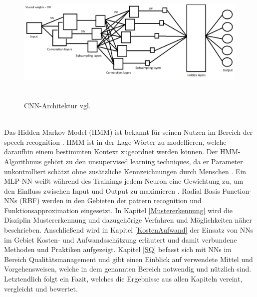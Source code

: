 \\
\vspace{6.0cm}
\begin{figure}[h]
\includegraphics[width=\linewidth, height=6cm]{Bilder/CNN/CNNArchitektur.png}
\caption{CNN-Architektur vgl. \cite{noisycnn}}
\end{figure}
\\
Das Hidden Markov Model (HMM) ist bekannt für seinen Nutzen im Bereich der speech recognition \cite{residualnn}. HMM ist in der Lage Wörter zu modellieren, welche daraufhin einem bestimmten Kontext zugeordnet werden können. Der HMM-Algorithmus gehört zu den unsupervised learning techniques, da er Parameter unkontrolliert schätzt ohne zusätzliche Kennzeichnungen durch Menschen \cite{hmm}. Ein MLP-NN weißt während des Trainings jedem Neuron eine Gewichtung zu, um den Einfluss zwischen Input und Output zu maximieren \cite{Khalifelu2012}. Radial Basis Function-NNs (RBF) werden in den Gebieten der pattern recognition und Funktionsapproximation eingesetzt. In Kapitel \ref{Mustererkennung} wird die Disziplin Mustererkennung und dazugehörige Verfahren und Möglichkeiten näher beschrieben. Anschließend wird in Kapitel \ref{KostenAufwand} der Einsatz von NNs im Gebiet Kosten- und Aufwandsschätzung erläutert und damit verbundene Methoden und Praktiken aufgezeigt. Kapitel \ref{SQ} befasst sich mit NNs im Bereich Qualitätsmanagement und gibt einen Einblick auf verwendete Mittel und Vorgehensweisen, welche in dem genannten Bereich notwendig und nützlich sind. Letztendlich folgt ein Fazit, welches die Ergebnisse aus allen Kapiteln vereint, vergleicht und bewertet.

\vspace{3.0cm}